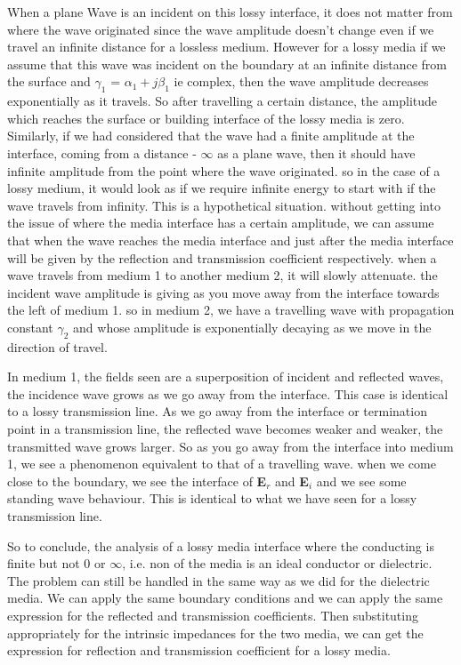 When a plane Wave is an incident on this lossy interface, it does not matter from where the wave originated since the wave amplitude doesn't change even if we travel an infinite distance for a lossless medium. However for a lossy media if we assume that this wave was incident on the boundary at an infinite distance from the surface and $\gamma_1$ = $\alpha_1 + j\beta_1$ ie complex, then the wave amplitude decreases exponentially as it travels. So after travelling a certain distance, the amplitude which reaches the surface or building interface of the lossy media is zero. Similarly, if we had considered that the wave had a finite amplitude at the interface, coming from a distance - $\infty$ as a plane wave, then it should have infinite amplitude from the point where the wave originated. so in the case of a lossy medium, it would look as if we require infinite energy to start with if the wave travels from infinity. This is a hypothetical situation. without getting into the issue of where the media interface has a certain amplitude, we can assume that when the wave reaches the media interface and just after the media interface will be given by the reflection and transmission coefficient respectively. when a wave travels from medium 1 to another medium 2, it will slowly attenuate. the incident wave amplitude is giving as you move away from the interface towards the left of medium 1. so in medium 2, we have a travelling wave with propagation constant $\gamma_2$ and whose amplitude is exponentially decaying as we move in the direction of travel.

In medium 1, the fields seen are a superposition of incident and reflected waves, the incidence wave grows as we go away from the interface. This case is identical to a lossy transmission line. As we go away from the interface or termination point in a transmission line, the reflected wave becomes weaker and weaker, the transmitted wave grows larger. So as you go away from the interface into medium 1, we see a phenomenon equivalent to that of a travelling wave. when we come close to the boundary, we see the interface of \textbf{E}$_r$ and \textbf{E}$_i$ and we see some standing wave behaviour. This is identical to what we have seen for a lossy transmission line.

So to conclude, the analysis of a lossy media interface where the conducting is finite but not 0 or $\infty$, i.e. non of the media is an ideal conductor or dielectric. The problem can still be handled in the same way as we did for the dielectric media. We can apply the same boundary conditions and we can apply the same expression for the reflected and transmission coefficients. Then substituting appropriately for the intrinsic impedances for the two media, we can get the expression for reflection and transmission coefficient for a lossy media. 



